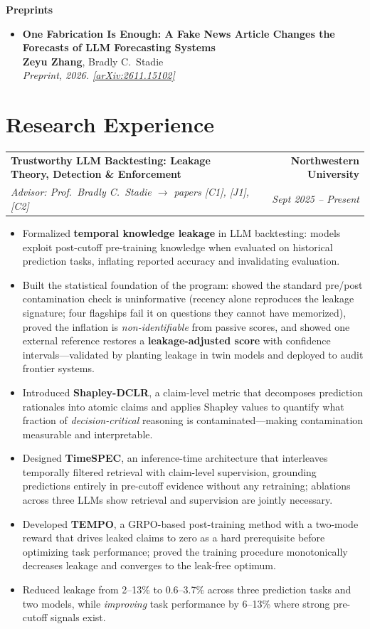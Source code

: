\documentclass[10.5pt]{article}
\makeatletter
\newcommand{\entry}[4]{%
  \begin{tabularx}{\textwidth}{@{}X@{}r@{}}
    \textbf{#1} & \textbf{#2} \\
    {\itshape\color{metagray}#3} & {\itshape\color{metagray}#4} \\
  \end{tabularx}\vspace{1pt}}
\newcommand{\pub}[4]{%
  \item[{[#1]}] \textbf{#2}\\
  {\small #3}\\
  {\small\itshape #4}}
\newenvironment{bullets}
  {\begin{itemize}[leftmargin=1.35em, topsep=2pt, itemsep=1.5pt, parsep=0pt,
                   label=\textcolor{accent}{\footnotesize$\bullet$}]\small}
  {\end{itemize}}
\newenvironment{publist}
  {\begin{itemize}[leftmargin=2.5em, topsep=2pt, itemsep=5pt, parsep=0pt]}
  {\end{itemize}}
\newcommand{\me}{\textbf{Zeyu Zhang}}
\makeatother
\begin{document}
\vspace{5pt}
\textbf{Preprints}
\begin{publist}
  \pub{P1}{One Fabrication Is Enough: A Fake News Article Changes the Forecasts of LLM Forecasting Systems}
    {\me, Bradly C.\ Stadie}
    {Preprint, 2026. \;
     {\upshape\small\href{https://arxiv.org/abs/2611.15102}{[arXiv:2611.15102]}}}
\end{publist}

\section{Research Experience}

\entry{Trustworthy LLM Backtesting: Leakage Theory, Detection \& Enforcement}
  {Northwestern University}
  {Advisor: Prof.\ Bradly C.\ Stadie \quad$\rightarrow$ papers [C1], [J1], [C2]}{Sept 2025 -- Present}
\begin{bullets}
  \item Formalized \textbf{temporal knowledge leakage} in LLM backtesting: models exploit post-cutoff
        pre-training knowledge when evaluated on historical prediction tasks, inflating reported
        accuracy and invalidating evaluation.
  \item Built the statistical foundation of the program: showed the standard pre/post contamination check
        is uninformative (recency alone reproduces the leakage signature; four flagships fail it on
        questions they cannot have memorized), proved the inflation is \emph{non-identifiable} from
        passive scores, and showed one external reference restores a \textbf{leakage-adjusted score}
        with confidence intervals---validated by planting leakage in twin models and deployed to audit
        frontier systems.
  \item Introduced \textbf{Shapley-DCLR}, a claim-level metric that decomposes prediction rationales into
        atomic claims and applies Shapley values to quantify what fraction of \emph{decision-critical}
        reasoning is contaminated---making contamination measurable and interpretable.
  \item Designed \textbf{TimeSPEC}, an inference-time architecture that interleaves temporally filtered
        retrieval with claim-level supervision, grounding predictions entirely in pre-cutoff evidence
        without any retraining; ablations across three LLMs show retrieval and supervision are jointly necessary.
  \item Developed \textbf{TEMPO}, a GRPO-based post-training method with a two-mode reward that drives
        leaked claims to zero as a hard prerequisite before optimizing task performance; proved the training
        procedure monotonically decreases leakage and converges to the leak-free optimum.
  \item Reduced leakage from 2--13\% to 0.6--3.7\% across three prediction tasks and two models, while
        \emph{improving} task performance by 6--13\% where strong pre-cutoff signals exist.
\end{bullets}
\end{document}
